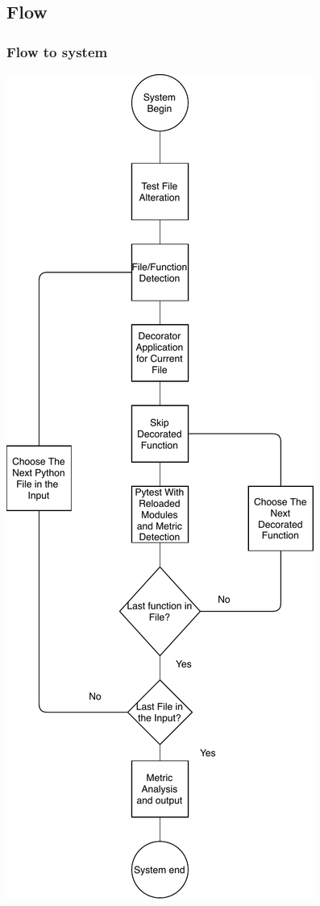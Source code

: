 \subsection{Flow}
\begin{frame}
  \frametitle{Flow to system}
    \begin{center}
      \includegraphics[scale = .25]{images/flow1}
    \end{center}
\end{frame}

